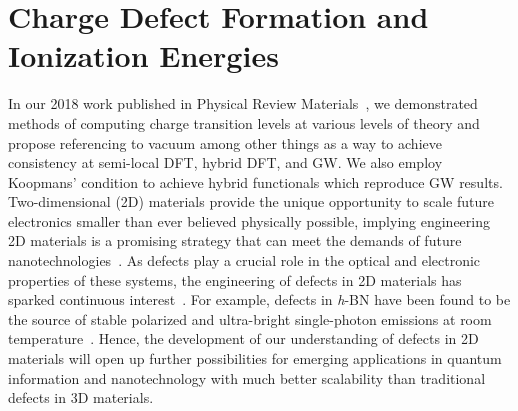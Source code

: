 \def\cbns{C$_\text{B}$}
\def\cb{C$_\text{B}$ }
\def\vncbns{V$_\text{N}$C$_\text{B}$}
\def\vncb{V$_\text{N}$C$_\text{B}$ }
\def\vnns{C$_\text{N}$}
\def\cn{C$_\text{N}$ }
\def\gwns{$G_0W_0$}
\def\gw{$G_0W_0$ }
\def\gns{$\Gamma$}
\def\g{$\Gamma$ }
\def\bR{\mathbf{R}}
\def\veps{\varepsilon}
\def\pans{PBE0($\alpha$)}
\def\p0a{PBE0($\alpha$)\text{}}


\section{Charge Defect Formation and Ionization Energies}

In our 2018 work published in Physical Review Materials~\cite{smart2018fundamental}, we demonstrated methods of computing charge transition levels at various levels of theory and propose referencing to vacuum among other things as a way to achieve consistency at semi-local DFT, hybrid DFT, and GW. We also employ Koopmans’ condition to achieve hybrid functionals which reproduce GW results.
Two-dimensional (2D) materials provide the unique opportunity to scale future electronics smaller than ever believed physically possible, implying engineering 2D materials is a promising strategy that can meet the demands of future nanotechnologies~\cite{butler2013progress}.
As defects play a crucial role in the optical and electronic properties of these systems, the engineering of defects in 2D materials has sparked continuous interest~\cite{wang2017engineering,hong2017atomic,lin2016defect,dreyer2018first,weston2018native,tawfik2017first}. For example, defects in \textit{h}-BN have been found to be the source of stable polarized and ultra-bright single-photon emissions at room temperature~\cite{bourrellier2016bright,abdi2018color,aharonovich2017quantum,tran2016quantum}. Hence, the development of our understanding of defects in 2D materials will open up further possibilities for emerging applications in quantum information and nanotechnology with much better scalability than traditional defects in 3D materials.

